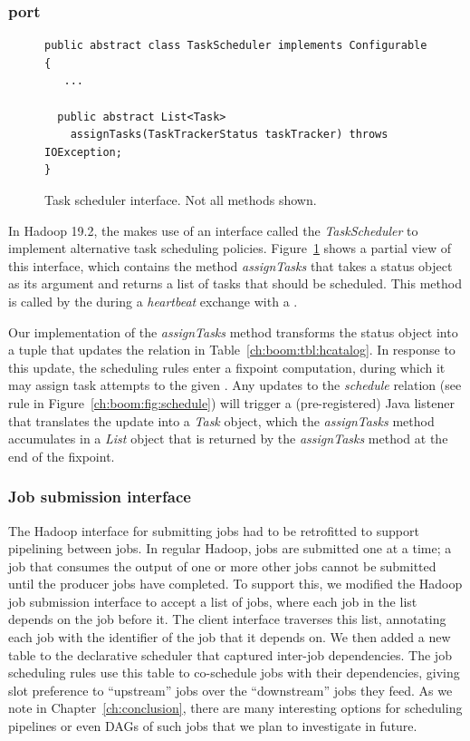 \subsubsection{\JOL port}
\begin{figure}
\ssp
\begin{minipage}{\linewidth}
\centering
\begin{verbatim}
public abstract class TaskScheduler implements Configurable {
   ...
   
  public abstract List<Task> 
  	assignTasks(TaskTrackerStatus taskTracker) throws IOException;
}
\end{verbatim}
\end{minipage}
\caption{Task scheduler interface. Not all methods shown.}
\label{ch:hop:fig:taskscheduler}
\end{figure}


In Hadoop 19.2, the \JT makes use of an interface called the {\em
TaskScheduler} to implement alternative task scheduling policies.
Figure~\ref{ch:hop:fig:taskscheduler} shows a partial view of this interface,
which contains the method {\em assignTasks} that takes a \TT status object as
its argument and returns a list of tasks that should be scheduled.  This method
is called by the \JT during a {\em heartbeat} exchange with a \TT.

Our implementation of the {\em assignTasks} method transforms the \TT status
object into a tuple that updates the  relation in
Table~\ref{ch:boom:tbl:hcatalog}.  In response to this update, the scheduling
rules enter a fixpoint computation, during which it may assign task attempts to
the given \TT.  Any updates to the {\em schedule} relation (see rule  in
Figure~\ref{ch:boom:fig:schedule}) will trigger a (pre-registered) Java
listener that translates the update into a {\em Task} object, which the {\em
assignTasks} method accumulates in a {\em List} object that is returned by the
{\em assignTasks} method at the end of the fixpoint.

\subsubsection{Job submission interface}

The Hadoop {\JT} interface for submitting jobs had to be retrofitted to support
pipelining between jobs.  In regular Hadoop, jobs are submitted one at a time;
a job that consumes the output of one or more other jobs cannot be submitted
until the producer jobs have completed.  To support this, we modified the
Hadoop job submission interface to accept a list of jobs, where each job in the
list depends on the job before it.  The client interface traverses this list,
annotating each job with the identifier of the job that it depends on.  We then
added a new table to the declarative scheduler that captured inter-job
dependencies.  The job scheduling rules use this table to co-schedule jobs with
their dependencies, giving slot preference to ``upstream'' jobs over the
``downstream'' jobs they feed.  As we note in Chapter~\ref{ch:conclusion},
there are many interesting options for scheduling pipelines or even DAGs of
such jobs that we plan to investigate in future.


